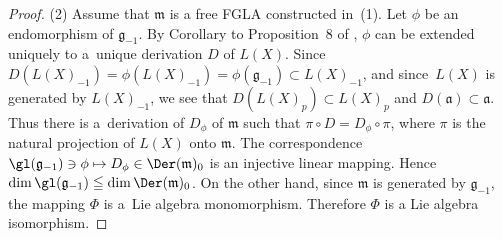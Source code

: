 \begin{proof}
(2) Assume that $\mathfrak m$ is a free FGLA
constructed in~(1).
Let $\phi$ be an endomorphism of $\mathfrak g_{-1}$.
By Corollary to Proposition~8 of \cite[Chapter~II, \S~2, no.~8]{bou72:1},
$\phi$ can be extended uniquely to a~unique derivation $D$ of $L(X)$.
Since $D(L(X)_{-1})=\phi(L(X)_{-1})=\phi(\mathfrak g_{-1})\subset L(X)_{-1}$,
and since~$L(X)$ is generated by $L(X)_{-1}$, we see that
$D(L(X)_{p})\subset L(X)_{p}$ and $D(\mathfrak a)\subset \mathfrak a$.
Thus there is a~derivation of $D_\phi$ of $\mathfrak m$ such that
$\pi\circ D=D_\phi\circ \pi$, where $\pi$ is the natural projection of $L(X)$ onto $\mathfrak m$.
The correspondence
$\gl(\mathfrak g_{-1})\ni\phi\mapsto D_\phi\in\Der(\mathfrak m)_0$
is an injective linear mapping.
Hence $\dim \gl(\mathfrak g_{-1})\leqq\dim \Der(\mathfrak m)_0$.
On the other hand, since $\mathfrak m$ is generated by $\mathfrak g_{-1}$,
the mapping $\Phi$ is a~Lie algebra monomorphism.
Therefore $\Phi$ is a Lie algebra isomorphism.
\end{proof}

